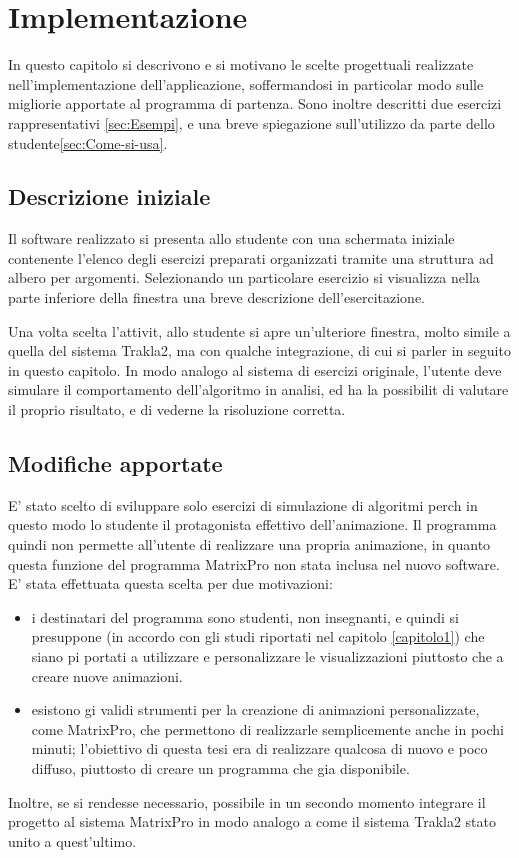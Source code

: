 
\chapter{Implementazione} 

In questo capitolo si descrivono e si motivano le scelte progettuali
realizzate nell'implementazione dell'applicazione, soffermandosi in
particolar modo sulle migliorie apportate al programma di partenza.
Sono inoltre descritti due esercizi rappresentativi \ref{sec:Esempi},
e una breve spiegazione sull'utilizzo da parte dello studente\ref{sec:Come-si-usa}.


\section{Descrizione iniziale}

Il software realizzato si presenta allo studente con una schermata
iniziale contenente l'elenco degli esercizi preparati organizzati
tramite una struttura ad albero per argomenti. Selezionando un particolare
esercizio si visualizza nella parte inferiore della finestra una breve
descrizione dell'esercitazione.

Una volta scelta l'attivit, allo studente si apre un'ulteriore finestra,
molto simile a quella del sistema Trakla2, ma con qualche integrazione,
di cui si parler in seguito in questo capitolo. In modo analogo al
sistema di esercizi originale, l'utente deve simulare il comportamento
dell'algoritmo in analisi, ed ha la possibilit di valutare il proprio
risultato, e di vederne la risoluzione corretta.


\section{Modifiche apportate}

E' stato scelto di sviluppare solo esercizi di simulazione di algoritmi
perch in questo modo lo studente  il protagonista effettivo dell'animazione.
Il programma quindi non permette all'utente di realizzare una propria
animazione, in quanto questa funzione del programma MatrixPro non
 stata inclusa nel nuovo software. E' stata effettuata questa scelta
per due motivazioni: 
\begin{itemize}
\item i destinatari del programma sono studenti, non insegnanti, e quindi
si presuppone (in accordo con gli studi riportati nel capitolo \ref{capitolo1})
che siano pi portati a utilizzare e personalizzare le visualizzazioni
piuttosto che a creare nuove animazioni.
\item esistono gi validi strumenti per la creazione di animazioni personalizzate,
come MatrixPro, che permettono di realizzarle semplicemente anche
in pochi minuti; l'obiettivo di questa tesi era di realizzare qualcosa
di nuovo e poco diffuso, piuttosto di creare un programma che  gia
disponibile.
\end{itemize}
Inoltre, se si rendesse necessario,  possibile in un secondo momento
integrare il progetto al sistema MatrixPro in modo analogo a come
il sistema Trakla2  stato unito a quest'ultimo.

